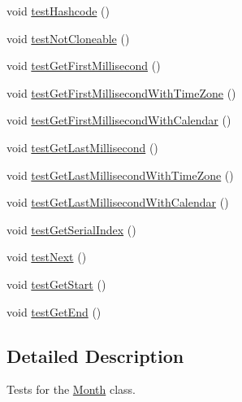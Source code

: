 \begin{DoxyCompactItemize}
\item 
void \mbox{\hyperlink{classorg_1_1jfree_1_1data_1_1time_1_1_month_test_a5d2858e2a92f70abee5e2c9de364f0f5}{test\+Hashcode}} ()
\item 
void \mbox{\hyperlink{classorg_1_1jfree_1_1data_1_1time_1_1_month_test_a57ca21752d50e7e34ef5e6dd47ba8cde}{test\+Not\+Cloneable}} ()
\item 
void \mbox{\hyperlink{classorg_1_1jfree_1_1data_1_1time_1_1_month_test_a1f639e8f1056319273fa85b0cc290041}{test\+Get\+First\+Millisecond}} ()
\item 
void \mbox{\hyperlink{classorg_1_1jfree_1_1data_1_1time_1_1_month_test_aa3d8343ec2c973d8e82a986b7027b6d1}{test\+Get\+First\+Millisecond\+With\+Time\+Zone}} ()
\item 
void \mbox{\hyperlink{classorg_1_1jfree_1_1data_1_1time_1_1_month_test_a24f2169a746b27a5babd3bec18ddcff2}{test\+Get\+First\+Millisecond\+With\+Calendar}} ()
\item 
void \mbox{\hyperlink{classorg_1_1jfree_1_1data_1_1time_1_1_month_test_afcd879903436921f877a9c5236058637}{test\+Get\+Last\+Millisecond}} ()
\item 
void \mbox{\hyperlink{classorg_1_1jfree_1_1data_1_1time_1_1_month_test_abd8ada962d4074a984226f7a7acc9781}{test\+Get\+Last\+Millisecond\+With\+Time\+Zone}} ()
\item 
void \mbox{\hyperlink{classorg_1_1jfree_1_1data_1_1time_1_1_month_test_a740b05d6782fa60d77953e4d589e6ed6}{test\+Get\+Last\+Millisecond\+With\+Calendar}} ()
\item 
void \mbox{\hyperlink{classorg_1_1jfree_1_1data_1_1time_1_1_month_test_ada603e5f30ea2acebe8eb02e54d4c72e}{test\+Get\+Serial\+Index}} ()
\item 
void \mbox{\hyperlink{classorg_1_1jfree_1_1data_1_1time_1_1_month_test_a7d520adbd13dae7cc86a1136fea61a3e}{test\+Next}} ()
\item 
void \mbox{\hyperlink{classorg_1_1jfree_1_1data_1_1time_1_1_month_test_a9f29b1b763978edbc228557cfd41fc21}{test\+Get\+Start}} ()
\item 
void \mbox{\hyperlink{classorg_1_1jfree_1_1data_1_1time_1_1_month_test_a63a2ae4c03b993add97d68802ffc5725}{test\+Get\+End}} ()
\end{DoxyCompactItemize}


\subsection{Detailed Description}
Tests for the \mbox{\hyperlink{classorg_1_1jfree_1_1data_1_1time_1_1_month}{Month}} class. 


